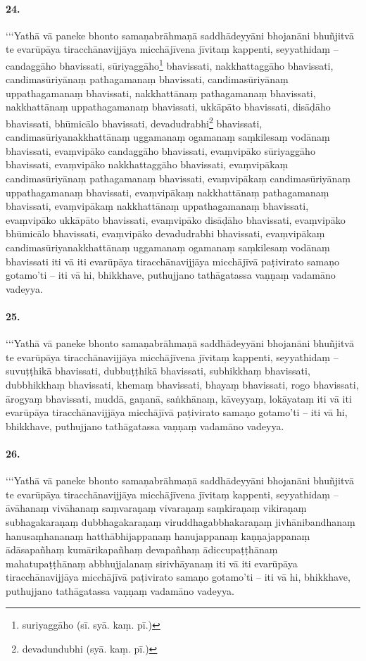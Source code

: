 \paragraph{24.}
‘‘‘Yathā vā paneke bhonto samaṇabrāhmaṇā saddhādeyyāni bhojanāni bhuñjitvā te evarūpāya tiracchānavijjāya micchājīvena jīvitaṃ kappenti, seyyathidaṃ – candaggāho bhavissati, sūriyaggāho\footnote{suriyaggāho (sī. syā. kaṃ. pī.)} bhavissati, nakkhattaggāho bhavissati, candimasūriyānaṃ pathagamanaṃ bhavissati, candimasūriyānaṃ uppathagamanaṃ bhavissati, nakkhattānaṃ pathagamanaṃ bhavissati, nakkhattānaṃ uppathagamanaṃ bhavissati, ukkāpāto bhavissati, disāḍāho bhavissati, bhūmicālo bhavissati, devadudrabhi\footnote{devadundubhi (syā. kaṃ. pī.)} bhavissati, candimasūriyanakkhattānaṃ uggamanaṃ ogamanaṃ saṃkilesaṃ vodānaṃ bhavissati, evaṃvipāko candaggāho bhavissati, evaṃvipāko sūriyaggāho bhavissati, evaṃvipāko nakkhattaggāho bhavissati, evaṃvipākaṃ candimasūriyānaṃ pathagamanaṃ bhavissati, evaṃvipākaṃ candimasūriyānaṃ uppathagamanaṃ bhavissati, evaṃvipākaṃ nakkhattānaṃ pathagamanaṃ bhavissati, evaṃvipākaṃ nakkhattānaṃ uppathagamanaṃ bhavissati, evaṃvipāko ukkāpāto bhavissati, evaṃvipāko disāḍāho bhavissati, evaṃvipāko bhūmicālo bhavissati, evaṃvipāko devadudrabhi bhavissati, evaṃvipākaṃ candimasūriyanakkhattānaṃ uggamanaṃ ogamanaṃ saṃkilesaṃ vodānaṃ bhavissati iti vā iti evarūpāya tiracchānavijjāya micchājīvā paṭivirato samaṇo gotamo’ti – iti vā hi, bhikkhave, puthujjano tathāgatassa vaṇṇaṃ vadamāno vadeyya.

\paragraph{25.}
‘‘‘Yathā vā paneke bhonto samaṇabrāhmaṇā saddhādeyyāni bhojanāni bhuñjitvā te evarūpāya tiracchānavijjāya micchājīvena jīvitaṃ kappenti, seyyathidaṃ – suvuṭṭhikā bhavissati, dubbuṭṭhikā bhavissati, subhikkhaṃ bhavissati, dubbhikkhaṃ bhavissati, khemaṃ bhavissati, bhayaṃ bhavissati, rogo bhavissati, ārogyaṃ bhavissati, muddā, gaṇanā, saṅkhānaṃ, kāveyyaṃ, lokāyataṃ iti vā iti evarūpāya tiracchānavijjāya micchājīvā paṭivirato samaṇo gotamo’ti – iti vā hi, bhikkhave, puthujjano tathāgatassa vaṇṇaṃ vadamāno vadeyya.

\paragraph{26.}
‘‘‘Yathā vā paneke bhonto samaṇabrāhmaṇā saddhādeyyāni bhojanāni bhuñjitvā te evarūpāya tiracchānavijjāya micchājīvena jīvitaṃ kappenti, seyyathidaṃ – āvāhanaṃ vivāhanaṃ saṃvaraṇaṃ vivaraṇaṃ saṃkiraṇaṃ vikiraṇaṃ subhagakaraṇaṃ dubbhagakaraṇaṃ viruddhagabbhakaraṇaṃ jivhānibandhanaṃ hanusaṃhananaṃ hatthābhijappanaṃ hanujappanaṃ kaṇṇajappanaṃ ādāsapañhaṃ kumārikapañhaṃ devapañhaṃ ādiccupaṭṭhānaṃ mahatupaṭṭhānaṃ abbhujjalanaṃ sirivhāyanaṃ iti vā iti evarūpāya tiracchānavijjāya micchājīvā paṭivirato samaṇo gotamo’ti – iti vā hi, bhikkhave, puthujjano tathāgatassa vaṇṇaṃ vadamāno vadeyya.

